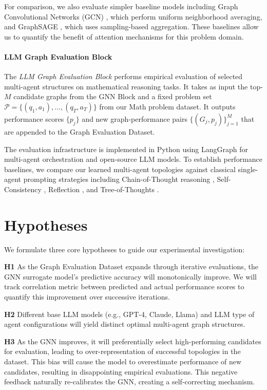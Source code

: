 \documentclass{article}
\begin{document}
For comparison, we also evaluate simpler baseline models including Graph Convolutional Networks (GCN) \cite{kipf2017semisupervisedclassificationgraphconvolutional}, which perform uniform neighborhood averaging, and GraphSAGE \cite{hamilton2018inductiverepresentationlearninglarge}, which uses sampling-based aggregation. These baselines allow us to quantify the benefit of attention mechanisms for this problem domain.

\paragraph{LLM Graph Evaluation Block}

The \textit{LLM Graph Evaluation Block} performs empirical evaluation of selected multi-agent structures on mathematical reasoning tasks. It takes as input the top-\(M\) candidate graphs from the GNN Block and a fixed problem set \(\mathcal{P} = \{(q_1, a_1), \ldots, (q_T, a_T)\}\) from our Math problem dataset. It outputs performance scores \(\{p_j\}\) and new graph-performance pairs \(\{(G_j, p_j)\}_{j=1}^{M}\) that are appended to the Graph Evaluation Dataset.

The evaluation infrastructure is implemented in Python using LangGraph \cite{langgraph2024} for multi-agent orchestration and open-source LLM models. To establish performance baselines, we compare our learned multi-agent topologies against classical single-agent prompting strategies including Chain-of-Thought reasoning \cite{wei2023chainofthoughtpromptingelicitsreasoning}, Self-Consistency \cite{wang2022selfconsistency}, Reflection \cite{shinn2023reflexion}, and Tree-of-Thoughts \cite{yao2023tree}. 

\section{Hypotheses}

We formulate three core hypotheses to guide our experimental investigation:

\textbf{H1} As the Graph Evaluation Dataset expands through iterative evaluations, the GNN surrogate model's predictive accuracy will monotonically improve. We will track correlation metric between predicted and actual performance scores to quantify this improvement over successive iterations.

\textbf{H2} Different base LLM models (e.g., GPT-4, Claude, Llama) and LLM type of agent configurations will yield distinct optimal multi-agent graph structures.

\textbf{H3} As the GNN improves, it will preferentially select high-performing candidates for evaluation, leading to over-representation of successful topologies in the dataset. This bias will cause the model to overestimate performance of new candidates, resulting in disappointing empirical evaluations. This negative feedback naturally re-calibrates the GNN, creating a self-correcting mechanism.



\end{document}
